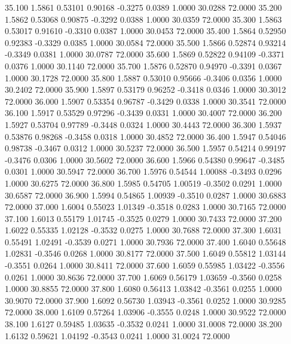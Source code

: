   35.100   1.5861   0.53101   0.90168  -0.3275   0.0389   1.0000  30.0288  72.0000
  35.200   1.5862   0.53068   0.90875  -0.3292   0.0388   1.0000  30.0359  72.0000
  35.300   1.5863   0.53017   0.91610  -0.3310   0.0387   1.0000  30.0453  72.0000
  35.400   1.5864   0.52950   0.92383  -0.3329   0.0385   1.0000  30.0584  72.0000
  35.500   1.5866   0.52874   0.93214  -0.3349   0.0381   1.0000  30.0787  72.0000
  35.600   1.5869   0.52822   0.94109  -0.3371   0.0376   1.0000  30.1140  72.0000
  35.700   1.5876   0.52870   0.94970  -0.3391   0.0367   1.0000  30.1728  72.0000
  35.800   1.5887   0.53010   0.95666  -0.3406   0.0356   1.0000  30.2402  72.0000
  35.900   1.5897   0.53179   0.96252  -0.3418   0.0346   1.0000  30.3012  72.0000
  36.000   1.5907   0.53354   0.96787  -0.3429   0.0338   1.0000  30.3541  72.0000
  36.100   1.5917   0.53529   0.97296  -0.3439   0.0331   1.0000  30.4007  72.0000
  36.200   1.5927   0.53704   0.97789  -0.3448   0.0324   1.0000  30.4443  72.0000
  36.300   1.5937   0.53876   0.98268  -0.3458   0.0318   1.0000  30.4852  72.0000
  36.400   1.5947   0.54046   0.98738  -0.3467   0.0312   1.0000  30.5237  72.0000
  36.500   1.5957   0.54214   0.99197  -0.3476   0.0306   1.0000  30.5602  72.0000
  36.600   1.5966   0.54380   0.99647  -0.3485   0.0301   1.0000  30.5947  72.0000
  36.700   1.5976   0.54544   1.00088  -0.3493   0.0296   1.0000  30.6275  72.0000
  36.800   1.5985   0.54705   1.00519  -0.3502   0.0291   1.0000  30.6587  72.0000
  36.900   1.5994   0.54865   1.00939  -0.3510   0.0287   1.0000  30.6883  72.0000
  37.000   1.6004   0.55023   1.01349  -0.3518   0.0283   1.0000  30.7165  72.0000
  37.100   1.6013   0.55179   1.01745  -0.3525   0.0279   1.0000  30.7433  72.0000
  37.200   1.6022   0.55335   1.02128  -0.3532   0.0275   1.0000  30.7688  72.0000
  37.300   1.6031   0.55491   1.02491  -0.3539   0.0271   1.0000  30.7936  72.0000
  37.400   1.6040   0.55648   1.02831  -0.3546   0.0268   1.0000  30.8177  72.0000
  37.500   1.6049   0.55812   1.03144  -0.3551   0.0264   1.0000  30.8411  72.0000
  37.600   1.6059   0.55985   1.03422  -0.3556   0.0261   1.0000  30.8636  72.0000
  37.700   1.6069   0.56179   1.03659  -0.3560   0.0258   1.0000  30.8855  72.0000
  37.800   1.6080   0.56413   1.03842  -0.3561   0.0255   1.0000  30.9070  72.0000
  37.900   1.6092   0.56730   1.03943  -0.3561   0.0252   1.0000  30.9285  72.0000
  38.000   1.6109   0.57264   1.03906  -0.3555   0.0248   1.0000  30.9522  72.0000
  38.100   1.6127   0.59485   1.03635  -0.3532   0.0241   1.0000  31.0008  72.0000
  38.200   1.6132   0.59621   1.04192  -0.3543   0.0241   1.0000  31.0024  72.0000
